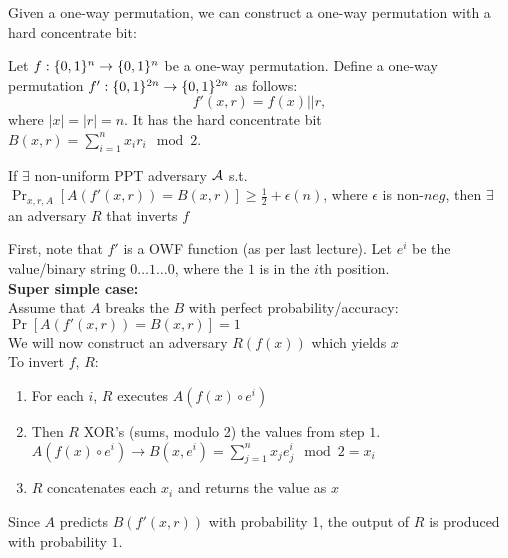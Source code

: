 \bigskip
Given a one-way permutation, we can construct a one-way permutation with a hard concentrate bit:
\begin{theorem}
Let  $f:\{0,1\}^{n} \rightarrow \{0,1\}^{n}$ be a one-way permutation.
Define a one-way permutation $f':\{0,1\}^{2n} \rightarrow \{0,1\}^{2n}$ as follows:
$$f'(x,r) = f(x) || r,$$
where $|x| = |r| =n$. It has the hard concentrate bit $B(x, r) = \sum_{i=1}^n x_i r_i\mod 2$.
\end{theorem}
\proof
{}
If $\exists$ non-uniform PPT adversary $\mathcal{A}$ s.t. $\Pr_{x,r,A}[A(f'(x,r)) = B(x,r)] \ge \frac{1}{2} + \epsilon(n)$, where $\epsilon$ is non-$neg$, then $\exists$ an adversary $R$ that inverts $f$

	First, note that $f'$ is a OWF function (as per last lecture).  Let $e^i$ be the value/binary string $0\ldots1\ldots0$, where the $1$ is in the $i$th position.\\

\textbf{Super simple case:}\\
	Assume that $A$ breaks the $B$ with perfect probability/accuracy: $\Pr[A(f'(x,r)) = B(x,r)] = 1$\\
	We will now construct an adversary $R(f(x))$ which yields $x$\\
	To invert $f$, $R$:
	\begin{enumerate}
		\item For each $i$, $R$ executes $A(f(x) \circ e^i)$
		\item Then $R$ XOR's (sums, modulo 2) the values from step $1$.  $A(f(x) \circ e^i) \rightarrow B(x, e^i) = \sum_{j=1}^n x_j e_j^i \mod 2  = x_i$
		\item $R$ concatenates each $x_i$ and returns the value as $x$
	\end{enumerate}
	Since $A$ predicts $B(f'(x,r))$ with probability 1, the output of $R$ is produced with probability $1$.\\

